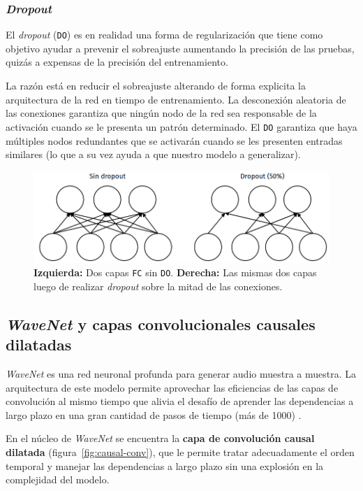 \documentclass[a4paper,12pt]{article}
\begin{document}
\subsubsection{\textit{Dropout}}
El \textit{dropout} (\texttt{DO}) es en realidad una forma de regularización que tiene como objetivo ayudar a prevenir el sobreajuste aumentando la precisión de las pruebas, quizás a expensas de la precisión del entrenamiento. \citep{rosebrock2017deep}

La razón está en reducir el sobreajuste alterando de forma explicita la arquitectura de la red en tiempo de entrenamiento. La desconexión aleatoria de las conexiones garantiza que ningún nodo de la red sea responsable de la activación cuando se le presenta un patrón determinado. El \texttt{DO} garantiza que haya múltiples nodos redundantes que se activarán cuando se les presenten entradas similares (lo que a su vez ayuda a que nuestro modelo a generalizar).

\begin{figure}[H]
	\begin{center}				
		\includegraphics[width=1\textwidth]{tesis_46.png}
		\caption{\textbf{Izquierda:} Dos capas \texttt{FC} sin \texttt{DO}. \textbf{Derecha:} Las mismas dos capas luego de realizar \textit{dropout} sobre la mitad de las conexiones.}
		\label{fig:type-pooling}
	\end{center}
\end{figure}

\subsection{\textit{WaveNet} y capas convolucionales causales dilatadas}

\textit{WaveNet} es una red neuronal profunda para generar audio muestra a muestra. La arquitectura de este modelo permite aprovechar las eficiencias de las capas de convolución al mismo tiempo que alivia el desafío de aprender las dependencias a largo plazo en una gran cantidad de pasos de tiempo (más de 1000) \citep{wavenet2}.

En el núcleo de \textit{WaveNet} se encuentra la \textbf{capa de convolución causal dilatada} (figura~\ref{fig:causal-conv}), que le permite tratar adecuadamente el orden temporal y manejar las dependencias a largo plazo sin una explosión en la complejidad del modelo. \citep{wavenet}
\end{document}

